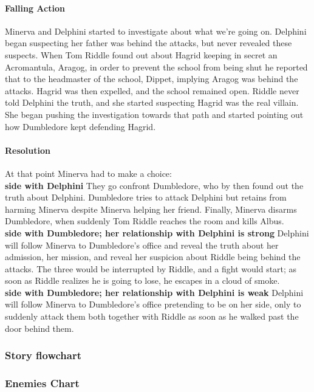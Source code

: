 \paragraph{Falling Action}
Minerva and Delphini started to investigate about what we're going on. Delphini began suspecting her father was behind the attacks, but never revealed these suspects.
When Tom Riddle found out about Hagrid keeping in secret an Acromantula, Aragog, in order to prevent the school from being shut he reported that to the headmaster of the school, Dippet, implying Aragog was behind the attacks. Hagrid was then expelled,  and the school remained open.
Riddle never told Delphini the truth, and she started suspecting Hagrid was the real villain. She began pushing the investigation towards that path  and started pointing out how Dumbledore kept defending Hagrid.

\paragraph{Resolution}
At that point Minerva had to make a choice: \\

\textbf{side with Delphini}
They go confront Dumbledore, who by then found out the truth about Delphini. Dumbledore tries to attack Delphini but retains from harming Minerva despite Minerva helping her friend. Finally, Minerva disarms Dumbledore, when suddenly Tom Riddle reaches the room and kills Albus.\\

\textbf{side with Dumbledore; her relationship with Delphini is strong}
Delphini will follow Minerva to Dumbledore's office and reveal the truth about her admission, her mission, and reveal her suspicion about Riddle being behind the attacks. The three would be interrupted by Riddle, and a fight would start; as soon as Riddle realizes he is going to lose, he escapes in a cloud of smoke.\\

\textbf{side with Dumbledore; her relationship with Delphini is weak}
Delphini will follow Minerva to Dumbledore's office pretending to be on her side, only to suddenly attack them both together with Riddle as soon as he walked past the door behind them.

\subsubsection{Story flowchart}


\subsubsection{Enemies Chart}

\pagebreak